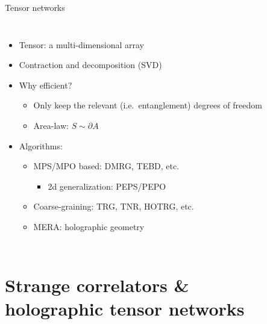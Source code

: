 \documentclass{fdubeamer}
\begin{document}
\begin{frame}{Tensor networks}

\begin{columns}[c]


    \begin{itemize}
      \item Tensor: a multi-dimensional array
      \item Contraction and decomposition (SVD)
      \item Why efficient?

        \begin{itemize}
          \item Only keep the relevant (i.e.\ entanglement) degrees of freedom
          \item Area-law: $S\sim\partial A$
        \end{itemize}

      \item Algorithms:

        \begin{itemize}
          \item MPS/MPO based: DMRG, TEBD, etc.

            \begin{itemize}
              \item 2d generalization: PEPS/PEPO
            \end{itemize}

          \item Coarse-graining: TRG, TNR, HOTRG, etc.
          \item MERA: holographic geometry
        \end{itemize}
    \end{itemize}


    \centering

\end{columns}


\end{frame}

\section{Strange correlators \& \\ holographic tensor networks}
\end{document}
